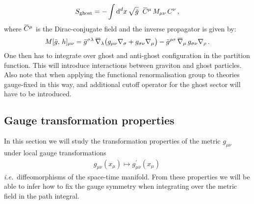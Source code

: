 \documentclass[11pt]{book}
\newcommand{\overbar}[1]{\mkern 1.5mu\overline{\mkern-1.5mu#1\mkern-1.5mu}\mkern 1.5mu}
\newcommand{\bnabla}{\overbar \nabla}
\newcommand\ie{\textit{i.e.}\ }
\numberwithin{equation}{chapter}
\begin{document}
\begin{appendices}
\begin{align}
  S_{\mathrm{ghost}} = - \int \mathrm{d}^dx \, \sqrt{\bar{g}} \;\;
  \overbar{C}^{\mu} \, M_{\mu\nu} \, C^{\nu} \,,
\end{align}
where $\overbar{C}^{\mu}$ is the Dirac-conjugate field and the inverse propagator is given by:
\begin{align}
  M[\bar g, \, h ]_{\mu\nu} = \bar{g}^{\sigma\lambda} \, \bnabla_\lambda
  \big(
    g_{\mu\nu}     \nabla_{\sigma}
    + g_{\sigma\nu} \nabla_{\mu}
  \big)
  - \bar{g}^{\rho\sigma} \, \bnabla_\mu \, g_{\sigma\nu} \nabla_{\rho} \,.
\end{align}
One then has to integrate over ghost and anti-ghost configuration in the partition function.
This will introduce interactions between graviton and ghost particles.
Also note that when applying the functional renormalisation group to theories
gauge-fixed in this way, and additional cutoff operator for the ghost sector will have to be
introduced.


\subsection{Gauge transformation properties}

In this section we will study the transformation properties
of the metric $g_{\mu\nu}$ under local gauge transformations
\begin{align}
  g_{\mu\nu}(x_\mu) \mapsto g^\prime_{\mu\nu}(x_\mu) \,
\end{align}
\ie diffeomorphisms of the space-time manifold.
From these properties we will be able to infer how to fix
the gauge symmetry when integrating
over the metric field in the path integral.


\end{appendices}
\end{document}
